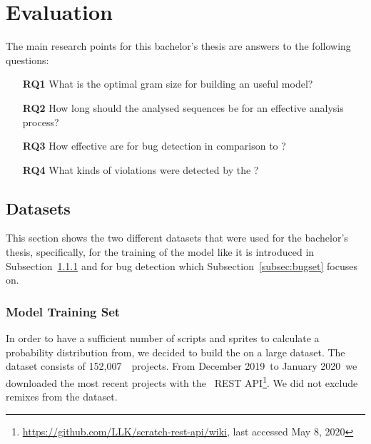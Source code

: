 
\newcommand{\numlarge}{152,007}
\newcommand{\monthstart}{December 2019}
\newcommand{\monthend}{January 2020}
\newcommand{\parsingexcp}{114}
\newcommand{\successfullyanalysed}{151,893}
\newcommand{\foundbugs}{100}
\newcommand{\modelduration}{72 h}
\newcommand{\bugfindingduration}{5 min}

\chapter{Evaluation}\label{chap:evaluation}

The main research points for this bachelor's thesis are answers to the following questions:
\begin{itemize}
\item[\textbf{RQ1}] What is the optimal gram size for building an useful model?
\item[\textbf{RQ2}] How long should the analysed sequences be for an effective analysis process?
\item[\textbf{RQ3}] How effective are  for bug detection in comparison to \litterbox{}?
\item[\textbf{RQ4}] What kinds of violations were detected by the \ngram{}?
\end{itemize}


\section{Datasets}\label{sec:dataset}
This section shows the two different datasets that were used for the bachelor's thesis, specifically, for the training of the model like it is introduced in Subsection~\ref{subsec:trainingset} and for bug detection which Subsection~\ref{subsec:bugset} focuses on.

\subsection{Model Training Set}\label{subsec:trainingset}
In order to have a sufficient number of scripts and sprites to calculate a probability distribution from, we decided to build the \ngram{} on a large dataset. The dataset consists of \numlarge\ \scratch\ projects. From \monthstart\ to \monthend\ we downloaded the most recent projects with the \scratch\ REST API\footnote{\url{https://github.com/LLK/scratch-rest-api/wiki}, last accessed May 8, 2020}. We did not exclude remixes from the dataset.

